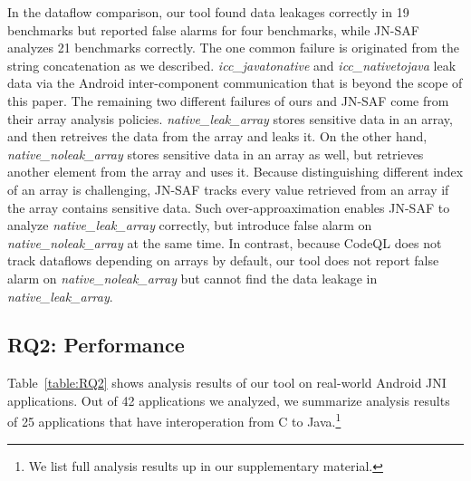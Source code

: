 In the dataflow comparison, our tool found data leakages correctly in 19
benchmarks but reported false alarms for four benchmarks, while JN-SAF analyzes
21 benchmarks correctly. The one common failure is originated from the string
concatenation as we described. {\it icc\_javatonative} and {\it
icc\_nativetojava} leak data via the Android inter-component communication that
is beyond the scope of this paper. The remaining two different failures of ours
and JN-SAF come from their array analysis policies. {\it native\_leak\_array}
stores sensitive data in an array, and then retreives the data from the array
and leaks it. On the other hand, {\it native\_noleak\_array} stores sensitive
data in an array as well, but retrieves another element from the array and uses
it. Because distinguishing different index of an array is challenging, JN-SAF
tracks every value retrieved from an array if the array contains sensitive
data. Such over-approaximation enables JN-SAF to analyze {\it
native\_leak\_array} correctly, but introduce false alarm on {\it
native\_noleak\_array} at the same time. In contrast, because CodeQL does not
track dataflows depending on arrays by default, our tool does not report false
alarm on {\it native\_noleak\_array} but cannot find the data leakage in {\it
native\_leak\_array}.


\subsection{RQ2: Performance}

Table~\ref{table:RQ2} shows analysis results of our tool on real-world Android
JNI applications. Out of 42 applications we analyzed, we summarize analysis
results of 25 applications that have interoperation from C to Java.\footnote{We
list full analysis results up in our supplementary material.} 




